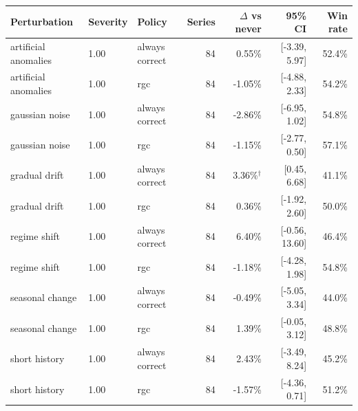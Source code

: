 \begin{tabular}{lllrrrr}
\toprule
Perturbation & Severity & Policy & Series & $\Delta$ vs never & 95\% CI & Win rate \\
\midrule
artificial anomalies & 1.00 & always correct & 84 & 0.55\% & [-3.39, 5.97] & 52.4\% \\
artificial anomalies & 1.00 & rgc & 84 & -1.05\% & [-4.88, 2.33] & 54.2\% \\
gaussian noise & 1.00 & always correct & 84 & -2.86\% & [-6.95, 1.02] & 54.8\% \\
gaussian noise & 1.00 & rgc & 84 & -1.15\% & [-2.77, 0.50] & 57.1\% \\
gradual drift & 1.00 & always correct & 84 & 3.36\%$^\dagger$ & [0.45, 6.68] & 41.1\% \\
gradual drift & 1.00 & rgc & 84 & 0.36\% & [-1.92, 2.60] & 50.0\% \\
regime shift & 1.00 & always correct & 84 & 6.40\% & [-0.56, 13.60] & 46.4\% \\
regime shift & 1.00 & rgc & 84 & -1.18\% & [-4.28, 1.98] & 54.8\% \\
seasonal change & 1.00 & always correct & 84 & -0.49\% & [-5.05, 3.34] & 44.0\% \\
seasonal change & 1.00 & rgc & 84 & 1.39\% & [-0.05, 3.12] & 48.8\% \\
short history & 1.00 & always correct & 84 & 2.43\% & [-3.49, 8.24] & 45.2\% \\
short history & 1.00 & rgc & 84 & -1.57\% & [-4.36, 0.71] & 51.2\% \\
\bottomrule
\end{tabular}
